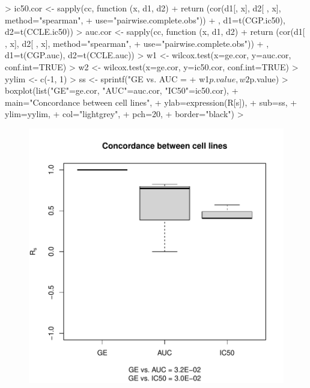 \documentclass[11pt]{article}
\begin{document}
\begin{Schunk}
\begin{Sinput}
>   ic50.cor <- sapply(cc, function (x, d1, d2) {
+     return (cor(d1[, x], d2[ , x], method="spearman",
+                 use="pairwise.complete.obs"))
+   }, d1=t(CGP.ic50), d2=t(CCLE.ic50))
>   auc.cor <- sapply(cc, function (x, d1, d2) {
+     return (cor(d1[ , x], d2[ , x], method="spearman",
+                 use="pairwise.complete.obs"))
+   }, d1=t(CGP.auc), d2=t(CCLE.auc))
>   w1 <- wilcox.test(x=ge.cor, y=auc.cor, conf.int=TRUE)
>   w2 <- wilcox.test(x=ge.cor, y=ic50.cor, conf.int=TRUE)
>   yylim <- c(-1, 1)
>   ss <- sprintf("GE vs. AUC = %
+                 w1$p.value, w2$p.value)
>   boxplot(list("GE"=ge.cor, "AUC"=auc.cor, "IC50"=ic50.cor),
+           main="Concordance between cell lines",
+           ylab=expression(R[s]),
+           sub=ss,
+           ylim=yylim,
+           col="lightgrey",
+           pch=20,
+           border="black")
> 
\end{Sinput}
\end{Schunk}

\begin{figure}[H!]
\begin{center}
\includegraphics{PharmacoGx-fig2}
\end{center}
\label{fig:one}
\end{figure}

\end{document}
